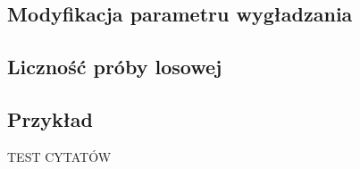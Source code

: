 \subsection{Modyfikacja parametru wygładzania}
\label{subsec:modyfikacje_h}

\subsection{Liczność próby losowej}

\subsection{Przykład}



TEST CYTATÓW
\cite{Kul10}
\cite{Kul05}
\cite{Kul12}
